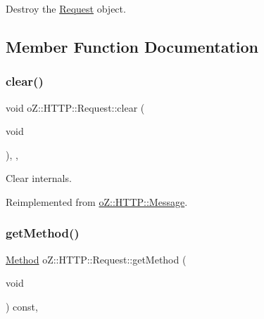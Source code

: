 Destroy the \mbox{\hyperlink{classo_z_1_1_h_t_t_p_1_1_request}{Request}} object. 



\subsection{Member Function Documentation}
\mbox{\label{classo_z_1_1_h_t_t_p_1_1_request_ac6611fadb3515ab2667ee96b8d93ef1d}} 
\subsubsection{\texorpdfstring{clear()}{clear()}}
{\footnotesize\ttfamily void o\+Z\+::\+H\+T\+T\+P\+::\+Request\+::clear (\begin{DoxyParamCaption}\item[{void}]{ }\end{DoxyParamCaption})\hspace{0.3cm}{\ttfamily [inline]}, {\ttfamily [override]}, {\ttfamily [virtual]}}



Clear internals. 



Reimplemented from \mbox{\hyperlink{classo_z_1_1_h_t_t_p_1_1_message_a6521457d95eeca4fbffaf5bc55e5d16d}{o\+Z\+::\+H\+T\+T\+P\+::\+Message}}.

\mbox{\label{classo_z_1_1_h_t_t_p_1_1_request_ab8c06f60e7d3b17c2ad03c7b9cb046d7}} 
\subsubsection{\texorpdfstring{getMethod()}{getMethod()}}
{\footnotesize\ttfamily \mbox{\hyperlink{namespaceo_z_1_1_h_t_t_p_a02d8497e4abbb0adf3af0fe9fad1b7a6}{Method}} o\+Z\+::\+H\+T\+T\+P\+::\+Request\+::get\+Method (\begin{DoxyParamCaption}\item[{void}]{ }\end{DoxyParamCaption}) const\hspace{0.3cm}{\ttfamily [inline]}, {\ttfamily [noexcept]}}



